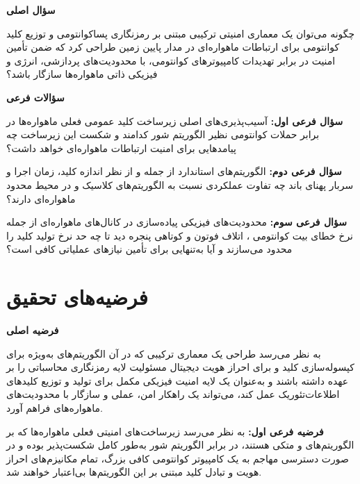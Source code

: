\documentclass[a4paper,14pt]{extreport}
\begin{document}
\textbf{سؤال اصلی}

چگونه می‌توان یک معماری امنیتی ترکیبی  مبتنی بر رمزنگاری پساکوانتومی  و توزیع کلید کوانتومی  برای ارتباطات ماهواره‌ای در مدار پایین زمین  طراحی کرد که ضمن تأمین امنیت در برابر تهدیدات کامپیوترهای کوانتومی، با محدودیت‌های پردازشی، انرژی و فیزیکی ذاتی ماهواره‌ها سازگار باشد؟

\medskip
\textbf{سؤالات فرعی}

\textbf{سؤال فرعی اول:} آسیب‌پذیری‌های اصلی زیرساخت کلید عمومی  فعلی ماهواره‌ها در برابر حملات کوانتومی نظیر الگوریتم شور کدامند و شکست این زیرساخت چه پیامدهایی برای امنیت ارتباطات ماهواره‌ای خواهد داشت؟

\textbf{سؤال فرعی دوم:} الگوریتم‌های استاندارد  از جمله  و  از نظر اندازه کلید، زمان اجرا و سربار پهنای باند چه تفاوت عملکردی نسبت به الگوریتم‌های کلاسیک  و  در محیط محدود ماهواره‌ای دارند؟

\textbf{سؤال فرعی سوم:} محدودیت‌های فیزیکی پیاده‌سازی  در کانال‌های ماهواره‌ای   از جمله نرخ خطای بیت کوانتومی ، اتلاف فوتون و کوتاهی پنجره دید  تا چه حد نرخ تولید کلید را محدود می‌سازند و آیا  به‌تنهایی برای تأمین نیازهای عملیاتی کافی است؟

\section{فرضیه‌های تحقیق}

\textbf{فرضیه اصلی}

به نظر می‌رسد طراحی یک معماری ترکیبی که در آن الگوریتم‌های   به‌ویژه  برای کپسوله‌سازی کلید  و  برای احراز هویت دیجیتال   مسئولیت لایه رمزنگاری محاسباتی را بر عهده داشته باشند و  به‌عنوان یک لایه امنیت فیزیکی مکمل برای تولید و توزیع کلیدهای اطلاعات‌تئوریک  عمل کند، می‌تواند یک راهکار امن، عملی و سازگار با محدودیت‌های ماهواره‌های  فراهم آورد.

\medskip
\textbf{فرضیه فرعی اول:} به نظر می‌رسد زیرساخت‌های امنیتی فعلی ماهواره‌ها که بر الگوریتم‌های  و  متکی هستند، در برابر الگوریتم شور به‌طور کامل شکست‌پذیر بوده و در صورت دسترسی مهاجم به یک کامپیوتر کوانتومی کافی بزرگ، تمام مکانیزم‌های احراز هویت و تبادل کلید مبتنی بر این الگوریتم‌ها بی‌اعتبار خواهند شد.
\end{document}
